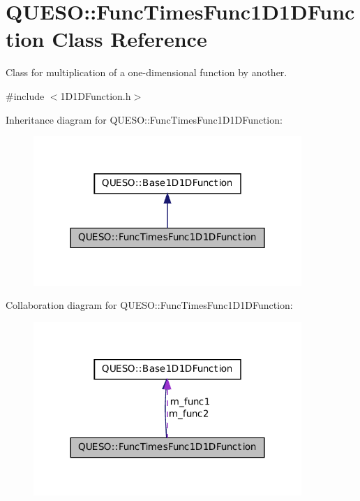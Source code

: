\hypertarget{class_q_u_e_s_o_1_1_func_times_func1_d1_d_function}{\section{Q\-U\-E\-S\-O\-:\-:Func\-Times\-Func1\-D1\-D\-Function Class Reference}
\label{class_q_u_e_s_o_1_1_func_times_func1_d1_d_function}
}


Class for multiplication of a one-\/dimensional function by another.  




{\ttfamily \#include $<$1\-D1\-D\-Function.\-h$>$}



Inheritance diagram for Q\-U\-E\-S\-O\-:\-:Func\-Times\-Func1\-D1\-D\-Function\-:
\nopagebreak
\begin{figure}[H]
\begin{center}
\leavevmode
\includegraphics[width=288pt]{class_q_u_e_s_o_1_1_func_times_func1_d1_d_function__inherit__graph}
\end{center}
\end{figure}


Collaboration diagram for Q\-U\-E\-S\-O\-:\-:Func\-Times\-Func1\-D1\-D\-Function\-:
\nopagebreak
\begin{figure}[H]
\begin{center}
\leavevmode
\includegraphics[width=288pt]{class_q_u_e_s_o_1_1_func_times_func1_d1_d_function__coll__graph}
\end{center}
\end{figure}
